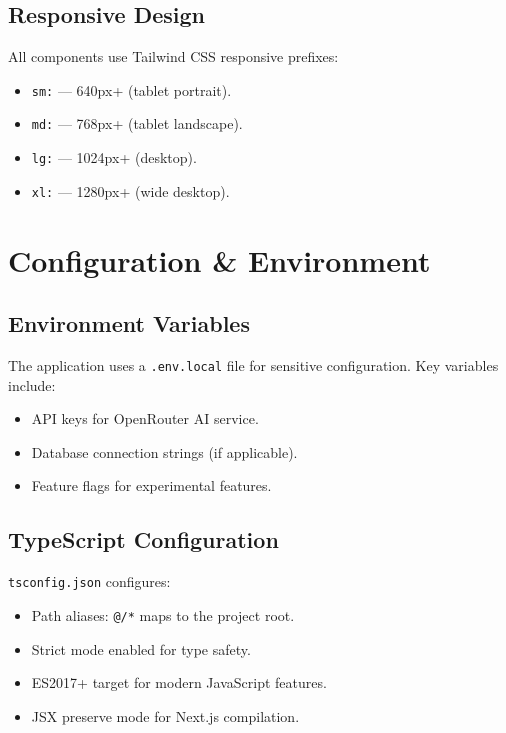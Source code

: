 \documentclass[12pt, a4paper, oneside]{report}
\newcommand{\filepath}[1]{\texttt{\small\color{codeblue}#1}}
\begin{document}
\section{Responsive Design}

All components use Tailwind CSS responsive prefixes:
\begin{itemize}[leftmargin=2em]
  \item \texttt{sm:} --- 640px+ (tablet portrait).
  \item \texttt{md:} --- 768px+ (tablet landscape).
  \item \texttt{lg:} --- 1024px+ (desktop).
  \item \texttt{xl:} --- 1280px+ (wide desktop).
\end{itemize}


\chapter{Configuration \& Environment}

\section{Environment Variables}

The application uses a \filepath{.env.local} file for sensitive configuration. Key variables include:

\begin{itemize}[leftmargin=2em]
  \item API keys for OpenRouter AI service.
  \item Database connection strings (if applicable).
  \item Feature flags for experimental features.
\end{itemize}

\section{TypeScript Configuration}

\filepath{tsconfig.json} configures:
\begin{itemize}[leftmargin=2em]
  \item Path aliases: \texttt{@/*} maps to the project root.
  \item Strict mode enabled for type safety.
  \item ES2017+ target for modern JavaScript features.
  \item JSX preserve mode for Next.js compilation.
\end{itemize}
\end{document}
